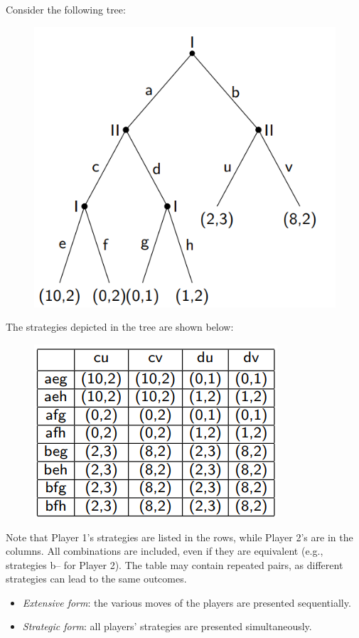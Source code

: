 \begin{example}
    Consider the following tree: 
    \begin{figure}[H]
        \centering
        \includegraphics[width=0.75\linewidth]{images/tree2.png}
    \end{figure}
    The strategies depicted in the tree are shown below:
    \begin{figure}[H]
        \centering
        \includegraphics[width=0.75\linewidth]{images/strategies.png}
    \end{figure}
    Note that Player 1's strategies are listed in the rows, while Player 2's are in the columns. 
    All combinations are included, even if they are equivalent (e.g., strategies b-- for Player 2). 
    The table may contain repeated pairs, as different strategies can lead to the same outcomes. 
    \begin{itemize} 
        \item \textit{Extensive form}: the various moves of the players are presented sequentially. 
        \item \textit{Strategic form}: all players' strategies are presented simultaneously. 
    \end{itemize}
\end{example}

